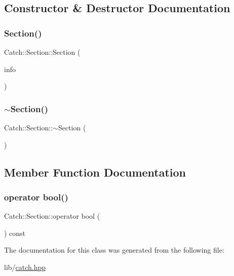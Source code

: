 \subsection{Constructor \& Destructor Documentation}
\hypertarget{class_catch_1_1_section_a68fd4e51e8981aaa7ddb00d8a6abd099}{}\label{class_catch_1_1_section_a68fd4e51e8981aaa7ddb00d8a6abd099} 
\subsubsection{\texorpdfstring{Section()}{Section()}}
{\footnotesize\ttfamily Catch\+::\+Section\+::\+Section (\begin{DoxyParamCaption}\item[{\hyperlink{struct_catch_1_1_section_info}{Section\+Info} const \&}]{info }\end{DoxyParamCaption})}

\hypertarget{class_catch_1_1_section_aa1422edd68a77aa578b5cc6b8b69f86f}{}\label{class_catch_1_1_section_aa1422edd68a77aa578b5cc6b8b69f86f} 
\subsubsection{\texorpdfstring{$\sim$\+Section()}{~Section()}}
{\footnotesize\ttfamily Catch\+::\+Section\+::$\sim$\+Section (\begin{DoxyParamCaption}{ }\end{DoxyParamCaption})}



\subsection{Member Function Documentation}
\hypertarget{class_catch_1_1_section_a0632b804dcea1417a2970620a9742eb3}{}\label{class_catch_1_1_section_a0632b804dcea1417a2970620a9742eb3} 
\subsubsection{\texorpdfstring{operator bool()}{operator bool()}}
{\footnotesize\ttfamily Catch\+::\+Section\+::operator bool (\begin{DoxyParamCaption}{ }\end{DoxyParamCaption}) const}



The documentation for this class was generated from the following file\+:\begin{DoxyCompactItemize}
\item 
lib/\hyperlink{catch_8hpp}{catch.\+hpp}\end{DoxyCompactItemize}
